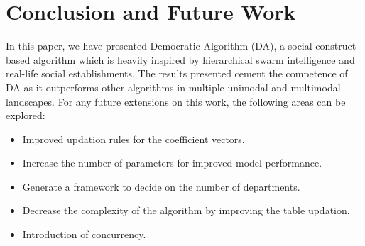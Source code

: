 \documentclass[conference]{IEEEtran}
\begin{document}
% 

\section{Conclusion and Future Work}

In this paper, we have presented Democratic Algorithm (DA), a social-construct-based algorithm which is heavily inspired by hierarchical swarm intelligence and real-life social establishments. The results presented cement the competence of DA as it outperforms other algorithms in multiple unimodal and multimodal landscapes. For any future extensions on this work, the following areas can be explored:

\begin{itemize}
\item Improved updation rules for the coefficient vectors.
\item Increase the number of parameters for improved model performance.
\item Generate a framework to decide on the number of departments.
\item Decrease the complexity of the algorithm by improving the table updation.
\item Introduction of concurrency.
\end{itemize}
\end{document}
